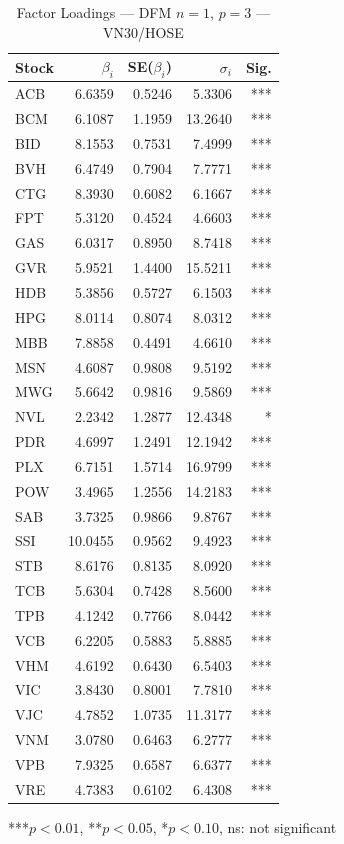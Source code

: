 \begin{table}[h]\centering
\caption{Factor Loadings — DFM $n=1$, $p=3$ — VN30/HOSE}
\begin{tabular}{lrrrr}\toprule
Stock & $\beta_i$ & SE($\beta_i$) & $\sigma_i$ & Sig.\\
\midrule
ACB & 6.6359 & 0.5246 & 5.3306 & *** \\
BCM & 6.1087 & 1.1959 & 13.2640 & *** \\
BID & 8.1553 & 0.7531 & 7.4999 & *** \\
BVH & 6.4749 & 0.7904 & 7.7771 & *** \\
CTG & 8.3930 & 0.6082 & 6.1667 & *** \\
FPT & 5.3120 & 0.4524 & 4.6603 & *** \\
GAS & 6.0317 & 0.8950 & 8.7418 & *** \\
GVR & 5.9521 & 1.4400 & 15.5211 & *** \\
HDB & 5.3856 & 0.5727 & 6.1503 & *** \\
HPG & 8.0114 & 0.8074 & 8.0312 & *** \\
MBB & 7.8858 & 0.4491 & 4.6610 & *** \\
MSN & 4.6087 & 0.9808 & 9.5192 & *** \\
MWG & 5.6642 & 0.9816 & 9.5869 & *** \\
NVL & 2.2342 & 1.2877 & 12.4348 & * \\
PDR & 4.6997 & 1.2491 & 12.1942 & *** \\
PLX & 6.7151 & 1.5714 & 16.9799 & *** \\
POW & 3.4965 & 1.2556 & 14.2183 & *** \\
SAB & 3.7325 & 0.9866 & 9.8767 & *** \\
SSI & 10.0455 & 0.9562 & 9.4923 & *** \\
STB & 8.6176 & 0.8135 & 8.0920 & *** \\
TCB & 5.6304 & 0.7428 & 8.5600 & *** \\
TPB & 4.1242 & 0.7766 & 8.0442 & *** \\
VCB & 6.2205 & 0.5883 & 5.8885 & *** \\
VHM & 4.6192 & 0.6430 & 6.5403 & *** \\
VIC & 3.8430 & 0.8001 & 7.7810 & *** \\
VJC & 4.7852 & 1.0735 & 11.3177 & *** \\
VNM & 3.0780 & 0.6463 & 6.2777 & *** \\
VPB & 7.9325 & 0.6587 & 6.6377 & *** \\
VRE & 4.7383 & 0.6102 & 6.4308 & *** \\
\bottomrule
\end{tabular}
\footnotesize{***$p<0.01$, **$p<0.05$, *$p<0.10$, ns: not significant}
\end{table}
